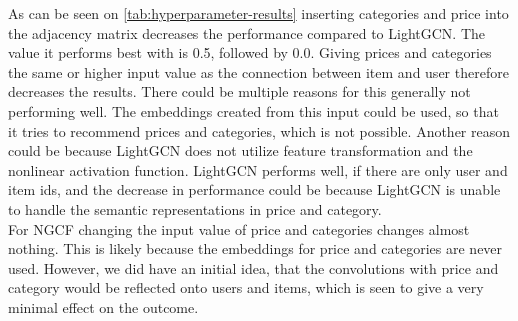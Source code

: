 As can be seen on \autoref{tab:hyperparameter-results} inserting categories and price into the adjacency matrix decreases the performance compared to LightGCN.
The value it performs best with is 0.5, followed by 0.0.
Giving prices and categories the same or higher input value as the connection between item and user therefore decreases the results.
There could be multiple reasons for this generally not performing well.
The embeddings created from this input could be used, so that it tries to recommend prices and categories, which is not possible.
Another reason could be because LightGCN does not utilize feature transformation and the nonlinear activation function.
LightGCN performs well, if there are only user and item ids, and the decrease in performance could be because LightGCN is unable to handle the semantic representations in price and category.\\
For NGCF changing the input value of price and categories changes almost nothing.
This is likely because the embeddings for price and categories are never used.
However, we did have an initial idea, that the convolutions with price and category would be reflected onto users and items, which is seen to give a very minimal effect on the outcome.

